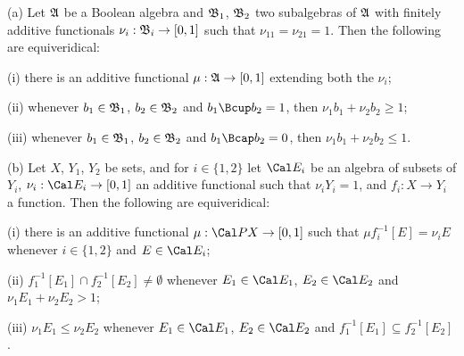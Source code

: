  (a) Let $\frak A$ be a Boolean algebra and
$\frak B_1$,
$\frak B_2$ two subalgebras of $\frak A$ with finitely additive
functionals $\nu_i:\frak B_i\to[0,1]$ such that $\nu_11=\nu_21=1$.
Then the following are equiveridical:

\quad(i) there is an additive functional
$\mu:\frak A\to[0,1]$ extending both the $\nu_i$;

\quad(ii) whenever $b_1\in\frak B_1$, $b_2\in\frak B_2$ and
$b_1\Bcup b_2=1$, then $\nu_1b_1+\nu_2b_2\ge 1$;

\quad(iii) whenever $b_1\in\frak B_1$, $b_2\in\frak B_2$ and
$b_1\Bcap b_2=0$, then $\nu_1b_1+\nu_2b_2\le 1$.

(b) Let $X$, $Y_1$, $Y_2$ be sets, and for $i\in\{1,2\}$ let $\Cal E_i$
be an algebra of subsets of $Y_i$, $\nu_i:\Cal E_i\to[0,1]$ an additive
functional such that $\nu_iY_i=1$, and $f_i:X\to Y_i$ a function.   Then
the following are equiveridical:

\quad(i) there is an additive functional
$\mu:\Cal PX\to[0,1]$ such that $\mu f_i^{-1}[E]=\nu_iE$ whenever
$i\in\{1,2\}$ and $E\in\Cal E_i$;

\quad(ii) $f_1^{-1}[E_1]\cap f_2^{-1}[E_2]\ne\emptyset$ whenever
$E_1\in\Cal E_1$, $E_2\in\Cal E_2$ and $\nu_1E_1+\nu_2E_2>1$;

\quad(iii) $\nu_1E_1\le\nu_2E_2$ whenever $E_1\in\Cal E_1$,
$E_2\in\Cal E_2$ and $f_1^{-1}[E_1]\subseteq f_2^{-1}[E_2]$.

